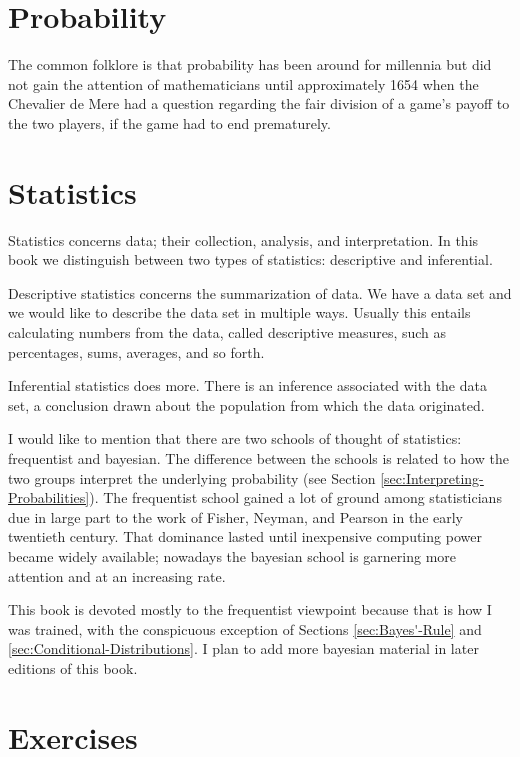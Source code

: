 \documentclass[captions=tableheading]{scrbook}
\begin{document}
\section{Probability}
\label{sec-1-1}


The common folklore is that probability has been around for millennia but did not gain the attention of mathematicians until approximately 1654 when the Chevalier de Mere had a question regarding the fair division of a game's payoff to the two players, if the game had to end prematurely.
\section{Statistics}
\label{sec-1-2}


Statistics concerns data; their collection, analysis, and interpretation. In this book we distinguish between two types of statistics: descriptive and inferential. 

Descriptive statistics concerns the summarization of data. We have a data set and we would like to describe the data set in multiple ways. Usually this entails calculating numbers from the data, called descriptive measures, such as percentages, sums, averages, and so forth.

Inferential statistics does more. There is an inference associated with the data set, a conclusion drawn about the population from which the data originated.

I would like to mention that there are two schools of thought of statistics: frequentist and bayesian. The difference between the schools is related to how the two groups interpret the underlying probability (see Section \ref{sec:Interpreting-Probabilities}). The frequentist school gained a lot of ground among statisticians due in large part to the work of Fisher, Neyman, and Pearson in the early twentieth century. That dominance lasted until inexpensive computing power became widely available; nowadays the bayesian school is garnering more attention and at an increasing rate.

This book is devoted mostly to the frequentist viewpoint because that is how I was trained, with the conspicuous exception of Sections \ref{sec:Bayes'-Rule} and \ref{sec:Conditional-Distributions}. I plan to add more bayesian material in later editions of this book.

\newpage{}
\section{Exercises}
\label{sec-1-3}
\end{document}

